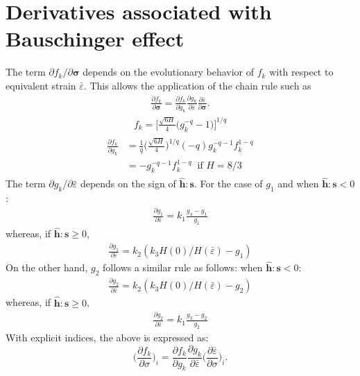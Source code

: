 \documentclass[12pt]{amsart}
\begin{document}
\newpage
\section{Derivatives associated with Bauschinger effect}
\label{sec:bauschinger}
The term $\partial f_k/\partial\mathbf{\sigma}$ depends on the evolutionary behavior of $f_k$ with respect to equivalent strain $\bar{\varepsilon}$.
This allows the application of the chain rule such as
\begin{eqnarray}
  \label{eq:dphib7}
  \frac{\partial f_k}{\partial\mathbf{\sigma}}=\frac{\partial f_k}{\partial g_k} \frac{\partial g_k}{\partial \bar{\varepsilon}}  \frac{\partial{\bar{\varepsilon}}}{\partial\mathbf{\sigma}}.
\end{eqnarray}
\begin{eqnarray}
  \label{eq:fk1}
  f_k = \bigg[ \frac{\sqrt{6H}}{4}   \Big(  g_k^{-q} - 1  \Big)  \bigg] ^{1/q}
\end{eqnarray}
\begin{eqnarray}
  \label{eq:fk2}
  \begin{split}
  \frac{\partial f_k}{\partial{g_k}} &= \frac{1}{q}   \bigg(\frac{\sqrt{6H}}{4} \bigg)^{1/q}  (-q) g_k^{-q-1}    f_k^{1-q}\\
  &=-g_k^{-q-1} f_k^{1-q}  \ \text{  if } H=8/3
  \end{split}
\end{eqnarray}
The term $  \partial{g_k}/\partial{\bar{\varepsilon}} $ depends on the sign of $\hat{\mathbf{h}}:\mathbf{s}$.
For the case of $g_1$ and when  $\hat{\mathbf{h}}:\mathbf{s}<0$:
\begin{eqnarray}
  \label{eq:dbau2}
\frac{\partial{g_1}}{\partial{\bar{\varepsilon}}}=k_1 \frac{g_4-g_1}{g_1}
\end{eqnarray}
whereas, if $\hat{\mathbf{h}}:\mathbf{s}\ge0$,
\begin{eqnarray}
  \label{eq:dbau3}
\frac{\partial{g_1}}{\partial{\bar{\varepsilon}}}=k_2 (k_3 H(0)/H(\bar{\varepsilon})-g_1)
\end{eqnarray}
On the other hand, $g_2$ follows a similar rule as follows:
when  $\hat{\mathbf{h}}:\mathbf{s}<0$:
\begin{eqnarray}
  \label{eq:dbau4}
  \frac{\partial{g_2}}{\partial{\bar{\varepsilon}}}=k_2 (k_3 H(0)/H(\bar{\varepsilon})-g_2)
\end{eqnarray}
whereas, if $\hat{\mathbf{h}}:\mathbf{s}\ge0$,
\begin{eqnarray}
  \label{eq:dbau5}
  \frac{\partial{g_2}}{\partial{\bar{\varepsilon}}}=k_1 \frac{g_3-g_2}{g_2}
\end{eqnarray}
With explicit indices, the above is expressed as:
\begin{equation}
  \label{eq:dphib8}
  \bigg(\frac{\partial f_k}{\partial \sigma}\bigg)_i = \frac{\partial f_k}{\partial g_k} \frac{\partial g_k}{\partial \bar{\varepsilon}}  \bigg(\frac{\partial\bar{\varepsilon}}{\partial\sigma}\bigg)_i.
\end{equation}
\newline
\end{document}
